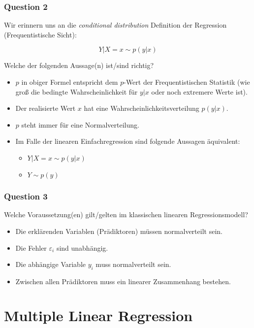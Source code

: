 \documentclass[
]{book}
\providecommand{\tightlist}{%
  \setlength{\itemsep}{0pt}\setlength{\parskip}{0pt}}
\begin{document}
\subsection{Question 2}\label{question-2-1}

Wir erinnern uns an die \emph{conditional distribution} Definition der Regression (Frequentistische Sicht):

\[Y|X = x \sim p(y|x)\]

Welche der folgenden Aussage(n) ist/sind richtig?

\begin{itemize}
\tightlist
\item
  \(p\) in obiger Formel entspricht dem \(p\)-Wert der Frequentistischen Statistik
  (wie groß die bedingte Wahrscheinlichkeit für \(y|x\) oder noch extremere Werte ist).
\item
  Der realisierte Wert \(x\) hat eine Wahrscheinlichkeitsverteilung \(p(y|x)\).
\item
  \(p\) steht immer für eine Normalverteilung.
\item
  Im Falle der linearen Einfachregression sind folgende Aussagen äquivalent:

  \begin{itemize}
  \tightlist
  \item
    \(Y|X = x \sim p(y|x)\)
  \item
    \(Y \sim p(y)\)
  \end{itemize}
\end{itemize}

\subsection{Question 3}\label{question-3-1}

Welche Voraussetzung(en) gilt/gelten im klassischen linearen Regressionsmodell?

\begin{itemize}
\tightlist
\item
  Die erklärenden Variablen (Prädiktoren) müssen normalverteilt sein.
\item
  Die Fehler \(\varepsilon_i\) sind unabhängig.
\item
  Die abhängige Variable \(y_i\) muss normalverteilt sein.
\item
  Zwischen allen Prädiktoren muss ein linearer Zusammenhang bestehen.
\end{itemize}

\chapter{Multiple Linear Regression}\label{multiple-linear-regression}
\end{document}

